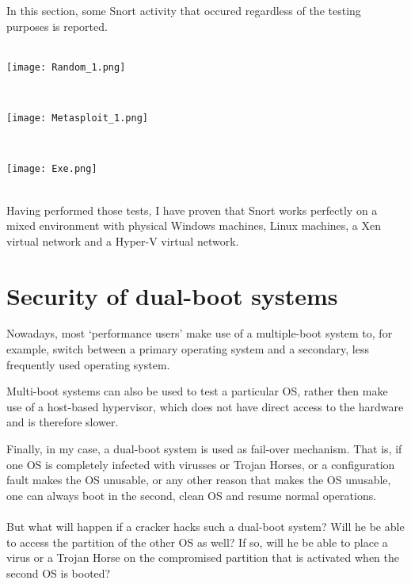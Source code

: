 In this section, some Snort activity that occured regardless of the testing purposes is reported. \\ \\

\noindent\begin{minipage}{\textwidth}
    \centering
    \texttt{[image: Random\_1.png]}
\end{minipage}
$\;$ \\ \\
\noindent\begin{minipage}{\textwidth}
    \centering
    \texttt{[image: Metasploit\_1.png]}
\end{minipage}
$\;$ \\ \\
\noindent\begin{minipage}{\textwidth}
    \centering
    \texttt{[image: Exe.png]}
\end{minipage}
$\;$ \\ \\
Having performed those tests, I have proven that Snort works perfectly on a mixed environment with physical Windows machines, Linux machines, a Xen virtual network and a Hyper-V virtual network.


\section{Security of dual-boot systems}

Nowadays, most `performance users' make use of a multiple-boot system to, for example, switch between a primary operating system and a secondary, less frequently used operating system.

Multi-boot systems can also be used to test a particular OS, rather then make use of a host-based hypervisor, which does not have direct access to the hardware and is therefore slower. 

Finally, in my case, a dual-boot system is used as fail-over mechanism. That is, if one OS is completely infected with virusses or Trojan Horses, or a configuration fault makes the OS unusable, or any other reason that makes the OS unusable, one can always boot in the second, clean OS and resume normal operations. \\ \\
But what will happen if a cracker hacks such a dual-boot system? Will he be able to access the partition of the other OS as well? If so, will he be able to place a virus or a Trojan Horse on the compromised partition that is activated when the second OS is booted?

